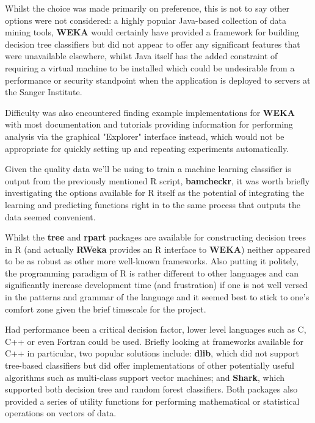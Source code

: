 Whilst the choice was made primarily on preference, this is not to say other
options were not considered: a highly popular Java-based collection of data
mining tools, \textbf{WEKA}\citep{weka} would certainly have provided a
framework for building decision tree classifiers but did not
appear to offer any significant features that were unavailable elsewhere, whilst
Java itself has the added constraint of requiring a virtual machine to be
installed which could be undesirable from a performance or security
standpoint when the application is deployed to servers at the Sanger Institute.

Difficulty was also encountered finding example implementations for \textbf{WEKA}
with most documentation and tutorials providing information for performing
analysis via the graphical "Explorer" interface instead, which would not be
appropriate for quickly setting up and repeating experiments automatically.

Given the quality data we'll be using to train a machine learning classifier is
output from the previously mentioned R script, \textbf{bamcheckr}, it was worth
briefly investigating the options available for R itself as the potential of
integrating the learning and predicting functions right in to the same process
that outputs the data seemed convenient.

Whilst the \textbf{tree}\citep{man:rtree} and \textbf{rpart}\citep{man:rpart}
packages are available for constructing decision trees in R (and actually
\textbf{RWeka} provides an R interface to \textbf{WEKA}) neither appeared to be
as robust as other more well-known frameworks. Also putting it politely, the
programming paradigm of R\citep{man:R} is rather different to other languages
and can significantly increase development time (and frustration\citep{argh}) if
one is not well versed in the patterns and grammar of the language  and it
seemed best to stick to one's comfort zone given the brief timescale for the
project.

Had performance been a critical decision factor, lower level languages such as
C, C++ or even Fortran could be used. Briefly looking at frameworks available
for C++ in particular, two popular solutions include: \textbf{dlib}\citep{dlib},
which did not support tree-based classifiers but did offer implementations of
other potentially useful algorithms such as multi-class support vector machines;
and \textbf{Shark}\citep{shark}, which supported both decision tree and random
forest classifiers. Both packages also provided a series of utility functions
for performing mathematical or statistical operations on vectors of data.


